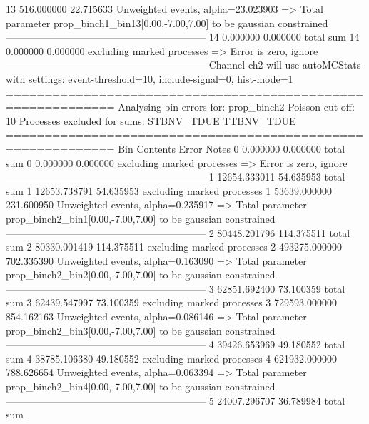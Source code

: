 13         516.000000      22.715633       Unweighted events, alpha=23.023903
  => Total parameter prop_binch1_bin13[0.00,-7.00,7.00] to be gaussian constrained
------------------------------------------------------------
14         0.000000        0.000000        total sum                     
14         0.000000        0.000000        excluding marked processes    
  => Error is zero, ignore      
------------------------------------------------------------
Channel ch2 will use autoMCStats with settings: event-threshold=10, include-signal=0, hist-mode=1
============================================================
Analysing bin errors for: prop_binch2
Poisson cut-off: 10
Processes excluded for sums: STBNV_TDUE TTBNV_TDUE
============================================================
Bin        Contents        Error           Notes                         
0          0.000000        0.000000        total sum                     
0          0.000000        0.000000        excluding marked processes    
  => Error is zero, ignore      
------------------------------------------------------------
1          12654.333011    54.635953       total sum                     
1          12653.738791    54.635953       excluding marked processes    
1          53639.000000    231.600950      Unweighted events, alpha=0.235917
  => Total parameter prop_binch2_bin1[0.00,-7.00,7.00] to be gaussian constrained
------------------------------------------------------------
2          80448.201796    114.375511      total sum                     
2          80330.001419    114.375511      excluding marked processes    
2          493275.000000   702.335390      Unweighted events, alpha=0.163090
  => Total parameter prop_binch2_bin2[0.00,-7.00,7.00] to be gaussian constrained
------------------------------------------------------------
3          62851.692400    73.100359       total sum                     
3          62439.547997    73.100359       excluding marked processes    
3          729593.000000   854.162163      Unweighted events, alpha=0.086146
  => Total parameter prop_binch2_bin3[0.00,-7.00,7.00] to be gaussian constrained
------------------------------------------------------------
4          39426.653969    49.180552       total sum                     
4          38785.106380    49.180552       excluding marked processes    
4          621932.000000   788.626654      Unweighted events, alpha=0.063394
  => Total parameter prop_binch2_bin4[0.00,-7.00,7.00] to be gaussian constrained
------------------------------------------------------------
5          24007.296707    36.789984       total sum                     
